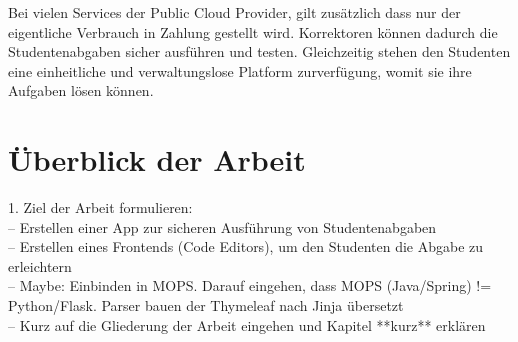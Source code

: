 Bei vielen Services der Public Cloud Provider, gilt zusätzlich dass nur der eigentliche Verbrauch in Zahlung gestellt wird.
Korrektoren können dadurch die Studentenabgaben sicher ausführen und testen.
Gleichzeitig stehen den Studenten eine einheitliche und verwaltungslose Platform zurverfügung,
womit sie ihre Aufgaben lösen können.



\section{Überblick der Arbeit}
1. Ziel der Arbeit formulieren:\\
-- Erstellen einer App zur sicheren Ausführung von Studentenabgaben\\
-- Erstellen eines Frontends (Code Editors), um den Studenten die Abgabe zu erleichtern\\
-- Maybe: Einbinden in MOPS. Darauf eingehen, dass MOPS (Java/Spring) != Python/Flask.
Parser bauen der Thymeleaf nach Jinja übersetzt\\
-- Kurz auf die Gliederung der Arbeit eingehen und Kapitel **kurz** erklären\\

